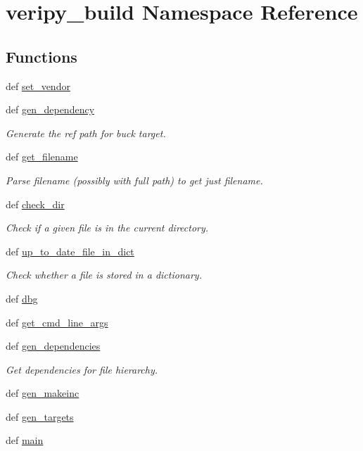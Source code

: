 \hypertarget{namespaceveripy__build}{\section{veripy\-\_\-build Namespace Reference}
\label{namespaceveripy__build}
}
\subsection*{Functions}
\begin{DoxyCompactItemize}
\item 
def \hyperlink{namespaceveripy__build_a0736b409728c78ed463b0a874c2c2fb7}{set\-\_\-vendor}
\item 
def \hyperlink{namespaceveripy__build_a6178761f2ff8928b6a62d67162a40fce}{gen\-\_\-dependency}
\begin{DoxyCompactList}\small\item\em Generate the ref path for buck target. \end{DoxyCompactList}\item 
def \hyperlink{namespaceveripy__build_a80261d50df22113324c3836e05d830e0}{get\-\_\-filename}
\begin{DoxyCompactList}\small\item\em Parse filename (possibly with full path) to get just filename. \end{DoxyCompactList}\item 
def \hyperlink{namespaceveripy__build_a356cd71b62d265319391ccf724f973be}{check\-\_\-dir}
\begin{DoxyCompactList}\small\item\em Check if a given file is in the current directory. \end{DoxyCompactList}\item 
def \hyperlink{namespaceveripy__build_aa5253a43a5638bea6f0bc8443bef6e3b}{up\-\_\-to\-\_\-date\-\_\-file\-\_\-in\-\_\-dict}
\begin{DoxyCompactList}\small\item\em Check whether a file is stored in a dictionary. \end{DoxyCompactList}\item 
def \hyperlink{namespaceveripy__build_ad15f70c8992262c4ccf73d9ad2d0a5d5}{dbg}
\item 
def \hyperlink{namespaceveripy__build_a1ddaebfe1aa25bd26928e8618a8324ba}{get\-\_\-cmd\-\_\-line\-\_\-args}
\item 
def \hyperlink{namespaceveripy__build_a8ce0c16c133c1fe238b95b074a4e084e}{gen\-\_\-dependencies}
\begin{DoxyCompactList}\small\item\em Get dependencies for file hierarchy. \end{DoxyCompactList}\item 
def \hyperlink{namespaceveripy__build_a4ffd6a4726bf6f5e1ee9de38f8a3d64f}{gen\-\_\-makeinc}
\item 
def \hyperlink{namespaceveripy__build_ad9d2867fc12d91b072d6e76a5818bc16}{gen\-\_\-targets}
\item 
def \hyperlink{namespaceveripy__build_af086be9a1cae10acf293fbe0d4a47fbb}{main}
\end{DoxyCompactItemize}


